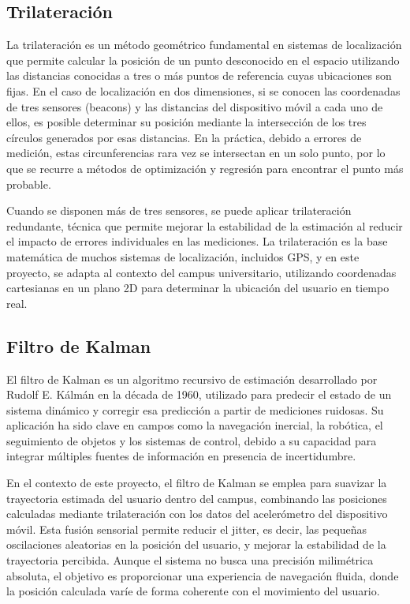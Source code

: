 \subsection{Trilateración}
{\justify La trilateración es un método geométrico fundamental en sistemas de localización que permite calcular la posición de un punto desconocido en el espacio utilizando las distancias conocidas a tres o más puntos de referencia cuyas ubicaciones son fijas. En el caso de localización en dos dimensiones, si se conocen las coordenadas de tres sensores (beacons) y las distancias del dispositivo móvil a cada uno de ellos, es posible determinar su posición mediante la intersección de los tres círculos generados por esas distancias. En la práctica, debido a errores de medición, estas circunferencias rara vez se intersectan en un solo punto, por lo que se recurre a métodos de optimización y regresión para encontrar el punto más probable.

Cuando se disponen más de tres sensores, se puede aplicar trilateración redundante, técnica que permite mejorar la estabilidad de la estimación al reducir el impacto de errores individuales en las mediciones. La trilateración es la base matemática de muchos sistemas de localización, incluidos GPS, y en este proyecto, se adapta al contexto del campus universitario, utilizando coordenadas cartesianas en un plano 2D para determinar la ubicación del usuario en tiempo real.}

\subsection{ Filtro de Kalman}
{\justify El filtro de Kalman es un algoritmo recursivo de estimación desarrollado por Rudolf E. Kálmán en la década de 1960, utilizado para predecir el estado de un sistema dinámico y corregir esa predicción a partir de mediciones ruidosas. Su aplicación ha sido clave en campos como la navegación inercial, la robótica, el seguimiento de objetos y los sistemas de control, debido a su capacidad para integrar múltiples fuentes de información en presencia de incertidumbre.

En el contexto de este proyecto, el filtro de Kalman se emplea para suavizar la trayectoria estimada del usuario dentro del campus, combinando las posiciones calculadas mediante trilateración con los datos del acelerómetro del dispositivo móvil. Esta fusión sensorial permite reducir el jitter, es decir, las pequeñas oscilaciones aleatorias en la posición del usuario, y mejorar la estabilidad de la trayectoria percibida. Aunque el sistema no busca una precisión milimétrica absoluta, el objetivo es proporcionar una experiencia de navegación fluida, donde la posición calculada varíe de forma coherente con el movimiento del usuario.}

